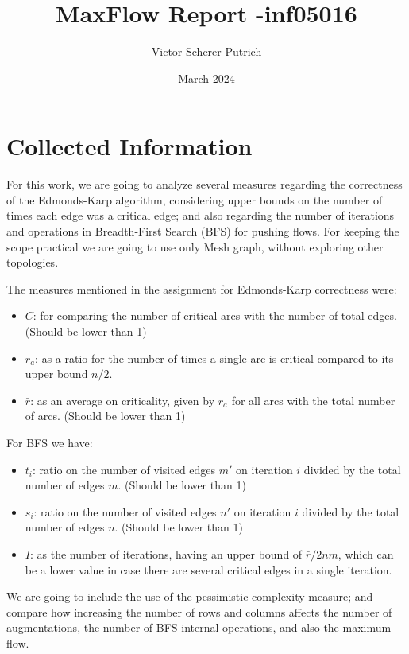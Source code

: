 \documentclass{article}
\title{MaxFlow Report -inf05016}
\author{Victor Scherer Putrich}
\date{March 2024}
\begin{document}
\maketitle


\section{Collected Information}

For this work, we are going to analyze several measures regarding the correctness of the Edmonds-Karp algorithm, considering upper bounds on the number of times each edge was a critical edge; and also regarding the number of iterations and operations in Breadth-First Search (BFS) for pushing flows. For keeping the scope practical we are going to use only Mesh graph, without exploring other topologies.

The measures mentioned in the assignment for Edmonds-Karp correctness were:
\begin{itemize}
    \item $C$: for comparing the number of critical arcs with the number of total edges. (Should be lower than 1)
    \item $r_a$: as a ratio for the number of times a single arc is critical compared to its upper bound $n/2$.
    \item $\bar{r}$: as an average on criticality, given by $r_a$ for all arcs with the total number of arcs. (Should be lower than 1)
\end{itemize}

For BFS we have:
\begin{itemize}
    \item $t_i$: ratio on the number of visited edges $m'$ on iteration $i$ divided by the total number of edges $m$. (Should be lower than 1) 
    \item $s_i$: ratio on the number of visited edges $n'$ on iteration $i$ divided by the total number of edges $n$. (Should be lower than 1) 
    \item $I$: as the number of iterations, having an upper bound of $\bar{r}/2nm$, which can be a lower value in case there are several critical edges in a single iteration.
\end{itemize}

We are going to include the use of the pessimistic complexity measure; and compare how increasing the number of rows and columns affects the number of augmentations, the number of BFS internal operations, and also the maximum flow.
\end{document}
